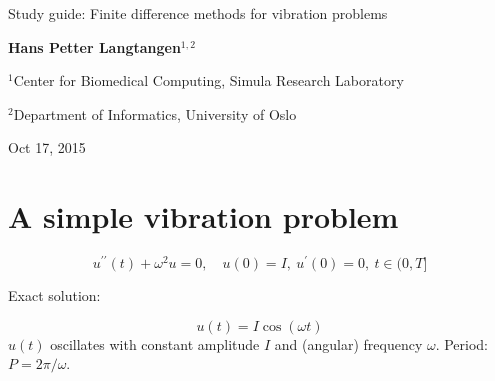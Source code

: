 \documentclass[%
oneside,                 %
final,                   %
10pt]{article}
\begin{document}







\thispagestyle{empty}

\begin{center}
{\LARGE\bf
\begin{spacing}{1.25}
Study guide: Finite difference methods for vibration problems
\end{spacing}
}
\end{center}


\begin{center}
{\bf Hans Petter Langtangen${}^{1, 2}$} \\ [0mm]
\end{center}

\begin{center}
\centerline{{\small ${}^1$Center for Biomedical Computing, Simula Research Laboratory}}
\centerline{{\small ${}^2$Department of Informatics, University of Oslo}}
\end{center}
    

\begin{center}
Oct 17, 2015
\end{center}

\vspace{1cm}


\section*{A simple vibration problem}


\[
u^{\prime\prime}(t) + \omega^2u = 0,\quad u(0)=I,\ u^{\prime}(0)=0,\ t\in (0,T]
\]

Exact solution:

\[
u(t) = I\cos (\omega t)
\]
$u(t)$ oscillates with constant amplitude $I$ and
(angular) frequency $\omega$.
Period: $P=2\pi/\omega$.
\end{document}
